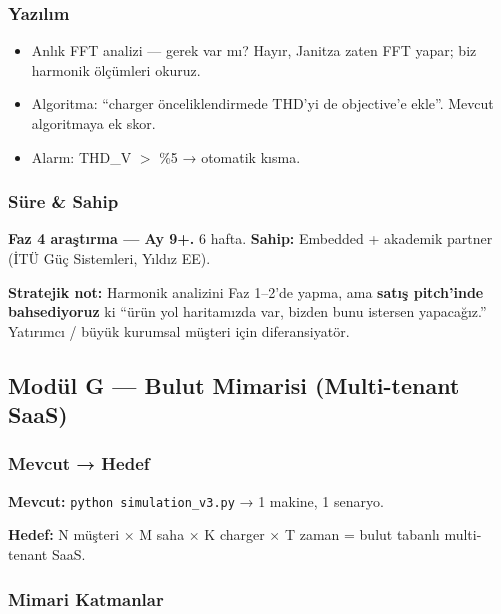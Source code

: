 \documentclass[11pt,a4paper]{article}
\begin{document}
\subsubsection{Yazılım}

\begin{itemize}
    \item Anlık FFT analizi --- gerek var mı? Hayır, Janitza zaten FFT yapar; biz harmonik ölçümleri okuruz.
    \item Algoritma: ``charger önceliklendirmede THD'yi de objective'e ekle''. Mevcut algoritmaya ek skor.
    \item Alarm: THD\_V $>$ \%5 → otomatik kısma.
\end{itemize}

\subsubsection{Süre \& Sahip}
\textbf{Faz 4 araştırma — Ay 9+.} 6 hafta. \textbf{Sahip:} Embedded + akademik partner (İTÜ Güç Sistemleri, Yıldız EE).

\begin{notebox}
\textbf{Stratejik not:} Harmonik analizini Faz 1--2'de yapma, ama \textbf{satış pitch'inde bahsediyoruz} ki ``ürün yol haritamızda var, bizden bunu istersen yapacağız.'' Yatırımcı / büyük kurumsal müşteri için diferansiyatör.
\end{notebox}

\subsection{Modül G — Bulut Mimarisi (Multi-tenant SaaS)}

\subsubsection{Mevcut → Hedef}

\textbf{Mevcut:} \texttt{python simulation\_v3.py} → 1 makine, 1 senaryo.

\textbf{Hedef:} N müşteri × M saha × K charger × T zaman = bulut tabanlı multi-tenant SaaS.

\subsubsection{Mimari Katmanlar}
\end{document}
